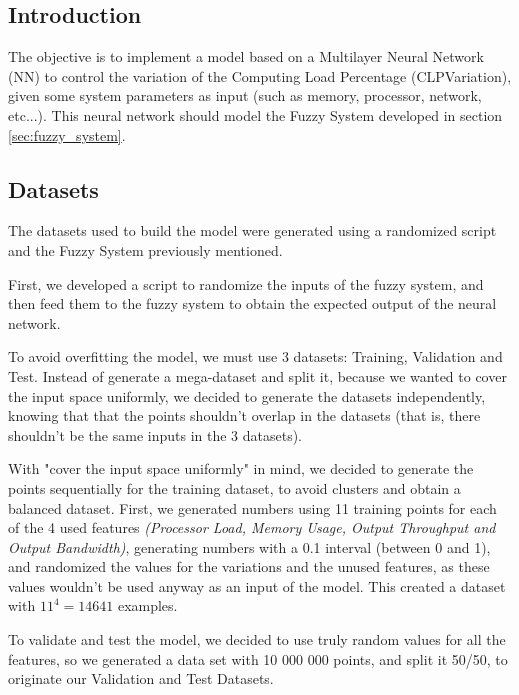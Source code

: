 
\subsection{Introduction}

The objective is to implement a model based on a Multilayer Neural Network (NN) to control the variation of the Computing Load Percentage (CLPVariation), given some system parameters as input (such as memory, processor, network, etc...).
This neural network should model the Fuzzy System developed in section \ref{sec:fuzzy_system}.


\subsection{Datasets}
The datasets used to build the model were generated using a randomized script and the Fuzzy System previously mentioned.

First, we developed a script to randomize the inputs of the fuzzy system, and then feed them to the fuzzy system to obtain the expected output of the neural network.

To avoid overfitting the model, we must use 3 datasets: Training, Validation and Test.
Instead of generate a mega-dataset and split it, because we wanted to cover the input space uniformly, we decided to generate the datasets independently, knowing that that the points shouldn't overlap in the datasets (that is, there shouldn't be the same inputs in the 3 datasets).

With "cover the input space uniformly" in mind, we decided to generate the points sequentially for the training dataset, to avoid clusters and obtain a balanced dataset. First, we generated numbers using 11 training points for each of the 4 used features \textit{(Processor Load, Memory Usage, Output Throughput and Output Bandwidth)}, generating numbers with a 0.1 interval (between 0 and 1), and randomized the values for the variations and the unused features, as these values wouldn't be used anyway as an input of the model. This created a dataset with $11^{4} = 14 641$ examples.

To validate and test the model, we decided to use truly random values for all the features, so we generated a data set with 10 000 000 points, and split it 50/50, to originate our Validation and Test Datasets.


